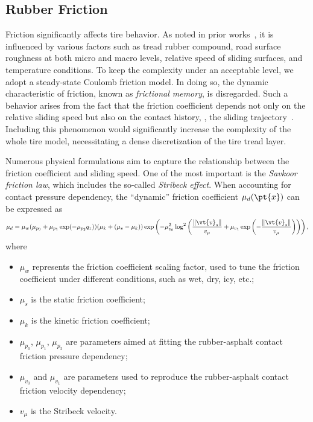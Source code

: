 
\subsection{Rubber Friction}
\label{chap4:sec:rubber_friction}

Friction significantly affects tire behavior. As noted in prior works~\cite{selig2014rubber, savkoor1965friction, savkoor1987dry, tiwari2017rubber}, it is influenced by various factors such as tread rubber compound, road surface roughness at both micro and macro levels, relative speed of sliding surfaces, and temperature conditions. To keep the complexity under an acceptable level, we adopt a steady-state Coulomb friction model. In doing so, the dynamic characteristic of friction,  known as \emph{frictional memory}, is disregarded. Such a behavior arises from the fact that the friction coefficient depends not only on the relative sliding speed but also on the contact history, \ie{}, the sliding trajectory~\cite{persson2010rubber}. Including this phenomenon would significantly increase the complexity of the whole tire model, necessitating a dense discretization of the tire tread layer.

Numerous physical formulations aim to capture the relationship between the friction coefficient and sliding speed. One of the most important is the \emph{Savkoor friction law}, which includes the so-called \emph{Stribeck effect}. When accounting for contact pressure dependency, the ``dynamic'' friction coefficient $\mu_d(\pt{x})$ can be expressed as
%
\begin{equation}
  \mu_d = \mu_w (\mu_{p_0} + \mu_{p_1} \exp( -\mu_{p_2} q_z )) (\mu_k + (\mu_s - \mu_k)) \exp\left( -\mu_{v_0}^2 \log^2 \left( \dfrac{\|\vt{v}_s\|}{v_\mu} + \mu_{v_1} \exp\left(-\dfrac{\|\vt{v}_s\|}{v_\mu}\right)\right)\right),
\end{equation}
%
where
%
\begin{itemize}
  \setlength{\itemsep}{0pt}
  \item $\mu_w$ represents the friction coefficient scaling factor, used to tune the friction coefficient under different conditions, such as wet, dry, icy, etc.;
  \item $\mu_s$ is the static friction coefficient;
  \item $\mu_k$ is the kinetic friction coefficient;
  \item $\mu_{p_0}$, $\mu_{p_1}$, $\mu_{p_2}$ are parameters aimed at fitting the rubber-asphalt contact friction pressure dependency;
  \item $\mu_{v_0}$ and $\mu_{v_1}$ are parameters used to reproduce the rubber-asphalt contact friction velocity dependency;
  \item $v_\mu$ is the Stribeck velocity.
\end{itemize}

